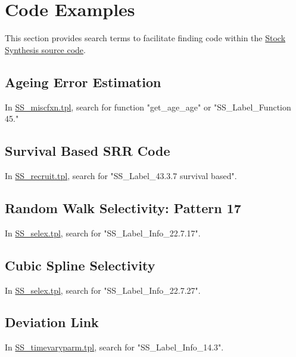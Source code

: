 \section{Code Examples}
\label{sec:codeappendix}

This section provides search terms to facilitate finding code within the \href{https://github.com/nmfs-stock-synthesis/stock-synthesis}{Stock Synthesis source code}. 

\subsection{Ageing Error Estimation}
\hypertarget{AgeingError}{}
In \href{https://github.com/nmfs-stock-synthesis/stock-synthesis/blob/main/SS_miscfxn.tpl}{SS\_miscfxn.tpl}, search for function "get\_age\_age" or "SS\_Label\_Function 45."

\subsection{Survival Based SRR Code}
In \href{https://github.com/nmfs-stock-synthesis/stock-synthesis/blob/main/SS_recruit.tpl}{SS\_recruit.tpl}, search for "SS\_Label\_43.3.7  survival based".

\subsection{Random Walk Selectivity: Pattern 17}
In \href{https://github.com/nmfs-stock-synthesis/stock-synthesis/blob/main/SS_selex.tpl}{SS\_selex.tpl}, search for "SS\_Label\_Info\_22.7.17".

\subsection{Cubic Spline Selectivity}
In \href{https://github.com/nmfs-stock-synthesis/stock-synthesis/blob/main/SS_selex.tpl}{SS\_selex.tpl}, search for "SS\_Label\_Info\_22.7.27".

\subsection{Deviation Link}
In \href{https://github.com/nmfs-stock-synthesis/stock-synthesis/blob/main/SS_timevaryparm.tpl}{SS\_timevaryparm.tpl}, search for "SS\_Label\_Info\_14.3".\

\normalfont %
\normalsize %

\pagebreak